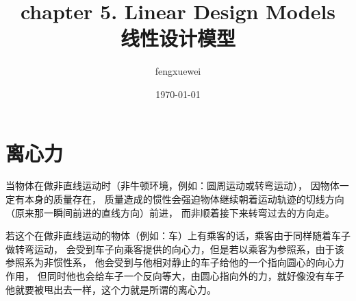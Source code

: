 \documentclass[UTF8,a4paper,10pt,nocolorlinks]{ctexart}
\title{
    \textbf{chapter 5. Linear Design Models}\\
    \textbf{线性设计模型}
}
\author{ fengxuewei }
\date{\today}
\begin{document}
    \maketitle
    
    \section{离心力}
    当物体在做非直线运动时（非牛顿环境，例如：圆周运动或转弯运动），
    因物体一定有本身的质量存在，
    质量造成的惯性会强迫物体继续朝着运动轨迹的切线方向（原来那一瞬间前进的直线方向）前进，
    而非顺着接下来转弯过去的方向走。
    \par 若这个在做非直线运动的物体（例如：车）上有乘客的话，乘客由于同样随着车子做转弯运动，
    会受到车子向乘客提供的向心力，但是若以乘客为参照系，由于该参照系为非惯性系，
    他会受到与他相对静止的车子给他的一个指向圆心的向心力作用，
    但同时他也会给车子一个反向等大，由圆心指向外的力，就好像没有车子他就要被甩出去一样，这个力就是所谓的离心力。
    \setcounter{page}{1}        %
\end{document}

